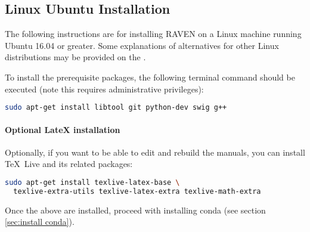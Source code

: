 \subsection{Linux Ubuntu Installation}
\label{sec:install ubunutu}
The following instructions are for installing RAVEN on a Linux machine running Ubuntu 16.04 or greater.  Some
explanations of alternatives for other Linux distributions may be provided on the \wiki.

To install the prerequisite packages, the following terminal command should be executed (note this requires
administrative privileges):

\begin{lstlisting}[language=bash]
 sudo apt-get install libtool git python-dev swig g++
\end{lstlisting}

\paragraph{Optional LateX installation}
Optionally, if you want to be able to edit and rebuild the manuals, you can
install \TeX~Live and its related packages:
\begin{lstlisting}[language=bash]
  sudo apt-get install texlive-latex-base \
  texlive-extra-utils texlive-latex-extra texlive-math-extra
\end{lstlisting}

Once the above are installed, proceed with installing conda (see section \ref{sec:install conda}).
